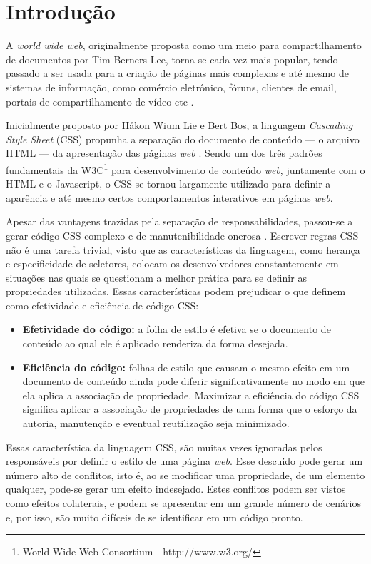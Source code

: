 \chapter{Introdução}
\label{chap:Intr}
A \textit{world wide web}, originalmente proposta como um meio para compartilhamento de documentos por Tim Berners-Lee, torna-se cada vez mais popular, tendo passado a ser usada para a criação de páginas mais complexas e até mesmo de sistemas de informação, como comércio eletrônico, fóruns, clientes de email, portais de compartilhamento de vídeo etc \cite{Berners-Lee:2000:WWO:556560}.

Inicialmente proposto por Håkon Wium Lie e Bert Bos, a linguagem \textit{Cascading Style Sheet} (CSS) propunha a separação do documento de conteúdo --- o arquivo HTML --- da apresentação das páginas \textit{web} \cite{Hakon:2005}. Sendo um dos três padrões fundamentais da W3C\footnote{World Wide Web Consortium - http://www.w3.org/} para desenvolvimento de conteúdo \textit{web}, juntamente com o HTML e o Javascript, o CSS se tornou largamente utilizado para definir a aparência e até mesmo certos comportamentos interativos em páginas \textit{web}. 

Apesar das vantagens trazidas pela separação de responsabilidades, passou-se a gerar código CSS complexo e de manutenibilidade onerosa \cite{Mesbah2012}. Escrever regras CSS não é uma tarefa trivial, visto que as características da linguagem, como herança e especificidade de seletores, colocam os desenvolvedores constantemente em situações nas quais se questionam a melhor prática para se definir as propriedades utilizadas. Essas características podem prejudicar o que  definem como efetividade e eficiência de código CSS:
\begin{itemize}
	\item\textbf{Efetividade do código:} a folha de estilo é efetiva se o documento de conteúdo ao qual ele é aplicado renderiza da forma desejada.
	
	\item\textbf{Eficiência do código:} folhas de estilo que causam o mesmo efeito em um documento de conteúdo ainda pode diferir significativamente no modo em que ela aplica a associação de propriedade. Maximizar a eficiência do código CSS significa aplicar a associação de propriedades de uma forma que o esforço da autoria, manutenção e eventual reutilização seja minimizado.
\end{itemize}

Essas característica da linguagem CSS, são muitas vezes ignoradas pelos responsáveis por definir o estilo de uma página \textit{web}. Esse descuido pode gerar um número alto de conflitos, isto é, ao se modificar uma propriedade, de um elemento qualquer, pode-se gerar um efeito indesejado. Estes conflitos podem ser vistos como efeitos colaterais, e podem se apresentar em um grande número de cenários e, por isso, são muito difíceis de se identificar em um código pronto.

